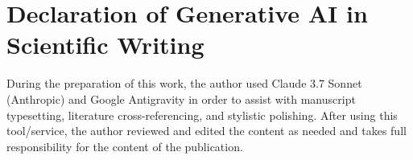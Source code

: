 \documentclass[3p,12pt]{elsarticle}
\theoremstyle{plain}
\theoremstyle{definition}
\begin{document}
\section*{Declaration of Generative AI in Scientific Writing}
During the preparation of this work, the author used Claude 3.7 Sonnet (Anthropic) and Google Antigravity in order to assist with manuscript typesetting, literature cross-referencing, and stylistic polishing. After using this tool/service, the author reviewed and edited the content as needed and takes full responsibility for the content of the publication.



\end{document}
